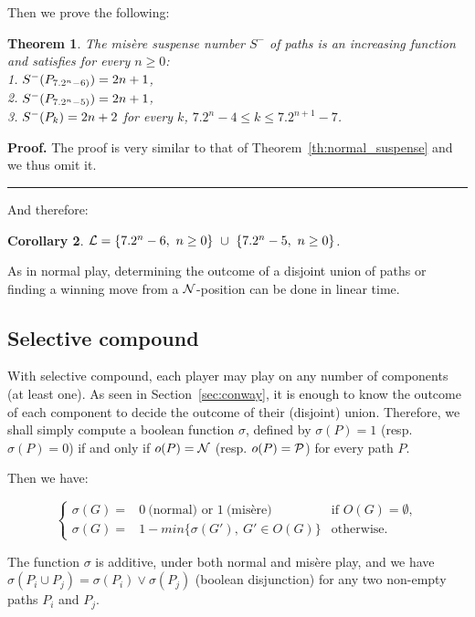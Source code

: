 \documentclass[11pt]{article}
\newcommand{\modif}[1]{\textcolor{black}{#1}}
\newcommand{\NN}{{\cal N}}
\newcommand{\PP}{{\cal P}}
\newcommand{\LL}{{\cal L}}
\newtheorem{theorem}{Theorem}
\newtheorem{corollary}[theorem]{Corollary}
\newcommand\qed{\mbox{}\hfill\rule{0.5em}{0.809em}\par\vskip 5mm}
\newenvironment{proof}[0]{\noindent\textbf{Proof.}}{\qed}
\begin{document}
Then we prove the following:

\begin{theorem}
The mis\`ere suspense number $S^-$ of paths is an increasing
function and satisfies for every $n\ge 0$:\\
1.  $\modif{S^-}(P_{7.2^n-6)})=2n+1$,\\
2.  $\modif{S^-}(P_{7.2^n-5)})=2n+1$,\\
3.  $\modif{S^-}(P_k)=2n+2$ for every $k$, $7.2^n-4\le k\le 7.2^{n+1}-7$.
\label{th:misere_suspense}
\end{theorem}

\begin{proof}
The proof is very similar to that of Theorem~\ref{th:normal_suspense} and we thus omit it.
\end{proof}

And therefore:

\begin{corollary}
$\LL=\{7.2^n-6,\ n\ge 0\}\ \cup\ \{7.2^n-5,\ n\ge 0\}$.
\end {corollary}

As in normal play, determining the outcome of a disjoint union
of paths or finding a winning move from a $\NN$-position can be done
in linear time.

\subsection{Selective compound}

With selective compound, each player may play on any number of components
(at least one). 
As seen in Section~\ref{sec:conway}, it is enough to know the outcome of each
component to decide the outcome of their (disjoint) union.
Therefore, we shall simply compute a boolean function $\sigma$, defined
by $\sigma(P)=1$ (resp. $\sigma(P)=0$) if and only if $o(P)=\NN$
(resp. $o(P)=\PP$) for every path $P$.

Then we have:

$$
\left\{\begin{array}{rll}
\sigma(G)= & 0\ \mbox{(normal) or\ } 
             1\ \mbox{(mis\`ere)} & \mbox{if\ } O(G) = \emptyset, \\
\sigma(G)=     & 1 - min\{\sigma(G'),\ G'\in O(G)\} & \mbox{otherwise}.
\end{array}
\right.
$$

The function $\sigma$ is additive, under
both normal and mis\`ere play, and we
have $\sigma(P_i\cup P_j)=\sigma(P_i)\vee\sigma(P_j)$ 
(boolean disjunction) for any
two non-empty paths $P_i$ and $P_j$.
\end{document}
